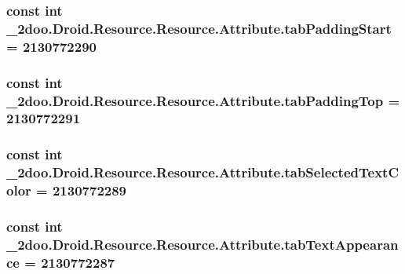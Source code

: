 \hypertarget{class__2doo_1_1_droid_1_1_resource_1_1_attribute_b368da1254313e62deb1b6666e6bbaaf}{
\subsubsection[{tabPaddingStart}]{\setlength{\rightskip}{0pt plus 5cm}const int \_\-2doo.Droid.Resource.Resource.Attribute.tabPaddingStart = 2130772290}}
\label{class__2doo_1_1_droid_1_1_resource_1_1_attribute_b368da1254313e62deb1b6666e6bbaaf}


\hypertarget{class__2doo_1_1_droid_1_1_resource_1_1_attribute_16179cdbfa4d5430f8a53fd4ac2d2a90}{
\subsubsection[{tabPaddingTop}]{\setlength{\rightskip}{0pt plus 5cm}const int \_\-2doo.Droid.Resource.Resource.Attribute.tabPaddingTop = 2130772291}}
\label{class__2doo_1_1_droid_1_1_resource_1_1_attribute_16179cdbfa4d5430f8a53fd4ac2d2a90}


\hypertarget{class__2doo_1_1_droid_1_1_resource_1_1_attribute_49b285a48055dc874846c6d5f62e5bfe}{
\subsubsection[{tabSelectedTextColor}]{\setlength{\rightskip}{0pt plus 5cm}const int \_\-2doo.Droid.Resource.Resource.Attribute.tabSelectedTextColor = 2130772289}}
\label{class__2doo_1_1_droid_1_1_resource_1_1_attribute_49b285a48055dc874846c6d5f62e5bfe}


\hypertarget{class__2doo_1_1_droid_1_1_resource_1_1_attribute_f8ff6cb0f4d70b6b8b98dcefe38c6de4}{
\subsubsection[{tabTextAppearance}]{\setlength{\rightskip}{0pt plus 5cm}const int \_\-2doo.Droid.Resource.Resource.Attribute.tabTextAppearance = 2130772287}}
\label{class__2doo_1_1_droid_1_1_resource_1_1_attribute_f8ff6cb0f4d70b6b8b98dcefe38c6de4}


